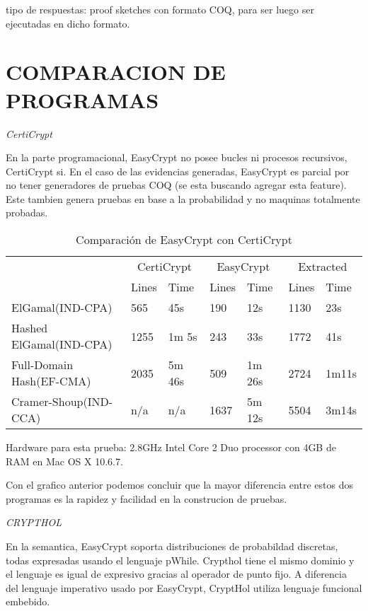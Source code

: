 \documentclass[runningheads,a4paper]{llncs}
\begin{document}
tipo de respuestas: proof sketches con formato COQ, para ser luego ser ejecutadas en dicho formato.\cite{article6}


\section{COMPARACION DE PROGRAMAS}
\centerline{\emph{CertiCrypt}}

En la parte programacional, EasyCrypt no posee bucles ni procesos recursivos, CertiCrypt si. En el caso de las evidencias generadas, EasyCrypt es parcial por no tener generadores de pruebas COQ (se esta buscando agregar esta feature). Este tambien genera pruebas en base a la probabilidad y no maquinas totalmente probadas.

\begin{table}
  \caption{Comparación de EasyCrypt con CertiCrypt}
  \label{tab:simple1}
  \centering
  \begin{tabular}{ |p{3.5cm}|p{1.5cm}|p{1.5cm}|p{1.5cm}|p{1.5cm}|p{1.5cm}|p{1.5cm}|  }
 \hline
 & \multicolumn{2}{|c|}{CertiCrypt} & \multicolumn{2}{|c|}{EasyCrypt} & \multicolumn{2}{|c|}{Extracted} \\\cline{2-7}

 &Lines&Time&Lines&Time&Lines&Time\\\cline{2-7}
 \hline
 ElGamal(IND-CPA) & 565 & 45s & 190 & 12s & 1130 & 23s\\
 Hashed ElGamal(IND-CPA) & 1255  & 1m 5s & 243  & 33s & 1772 & 41s\\
 Full-Domain Hash(EF-CMA) & 2035 & 5m 46s&  509 & 1m 26s & 2724 & 1m11s\\
 Cramer-Shoup(IND-CCA) & n/a & n/a & 1637 & 5m 12s & 5504 & 3m14s\\
 \hline
\end{tabular}
\end{table}

Hardware para esta prueba: 2.8GHz Intel Core 2 Duo processor con 4GB de RAM en Mac OS X 10.6.7.\cite{article5}

Con el grafico anterior podemos concluir que la mayor diferencia entre estos dos programas es la rapidez y facilidad en la construcion de pruebas.

\centerline{\emph{CRYPTHOL}}

En la semantica, EasyCrypt soporta distribuciones de probabildad discretas, todas expresadas usando el lenguaje pWhile. Crypthol tiene el mismo dominio y el lenguaje es igual de expresivo gracias al operador de punto fijo. A diferencia del lenguaje imperativo usado por EasyCrypt, CryptHol utiliza lenguaje funcional embebido.
\end{document}
